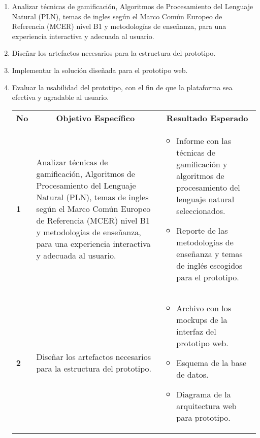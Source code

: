 \begin{enumerate}
    \item Analizar técnicas de gamificación, Algoritmos de Procesamiento del Lenguaje Natural (PLN), temas de ingles según el Marco Común Europeo de Referencia (MCER) nivel B1 y metodologías de enseñanza, para una experiencia interactiva y adecuada al usuario.
    \item Diseñar los artefactos necesarios para la estructura del prototipo.
    \item Implementar la solución diseñada para el prototipo web.
    \item Evaluar la usabilidad del prototipo, con el fin de que la plataforma sea efectiva y agradable al usuario.

\begin{table}[H]
\begin{tabular*}{\textwidth}{|p{}|p{}|p{}|}
\cline{1-3}
\multicolumn{1}{|c|}{\cellcolor[gray]{0.9} \textbf{No}} & \multicolumn{1}{|c|}{\cellcolor[gray]{0.9} \textbf{Objetivo Específico}} & \multicolumn{1}{|c|}{\cellcolor[gray]{0.9} \textbf{Resultado Esperado}} \\

\cline{1-3}
\textbf{1} & Analizar técnicas de gamificación, Algoritmos de Procesamiento del Lenguaje Natural (PLN), temas de ingles según el Marco Común Europeo de Referencia (MCER) nivel B1 y metodologías de enseñanza, para una experiencia interactiva y adecuada al usuario. & 
\begin{itemize}[left=0pt] 

    \item Informe con las técnicas de gamificación y algoritmos de procesamiento del lenguaje natural seleccionados.
    \item Reporte de las metodologías de enseñanza y temas de inglés escogidos para el prototipo.
\end{itemize} \\

\cline{1-3}
\textbf{2} & Diseñar los artefactos necesarios para la estructura del prototipo.  & 
\begin{itemize}[left=0pt]
    \item Archivo con los mockups de la interfaz del prototipo web.

    \item Esquema de la base de datos.

    \item Diagrama de la arquitectura web para prototipo.


\end{itemize}
\end{tabular*}
\end{table}
\end{enumerate}
